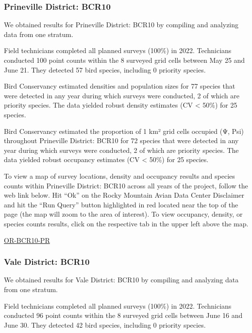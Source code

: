 \documentclass[
  letterpaper,
  DIV=11,
  numbers=noendperiod,
  oneside]{scrreprt}
\begin{document}
\hypertarget{prineville-district-bcr10}{%
\subsubsection{Prineville District:
BCR10}\label{prineville-district-bcr10}}

We obtained results for Prineville District: BCR10 by compiling and
analyzing data from one stratum.

Field technicians completed all planned surveys (100\%) in 2022.
Technicians conducted 100 point counts within the 8 surveyed grid cells
between May 25 and June 21. They detected 57 bird species, including 0
priority species.

Bird Conservancy estimated densities and population sizes for 77 species
that were detected in any year during which surveys were conducted, 2 of
which are priority species. The data yielded robust density estimates
(CV \textless{} 50\%) for 25 species.

Bird Conservancy estimated the proportion of 1 km² grid cells occupied
(Ψ, Psi) throughout Prineville District: BCR10 for 72 species that were
detected in any year during which surveys were conducted, 2 of which are
priority species. The data yielded robust occupancy estimates (CV
\textless{} 50\%) for 25 species.

To view a map of survey locations, density and occupancy results and
species counts within Prineville District: BCR10 across all years of the
project, follow the web link below. Hit ``Ok'' on the Rocky Mountain
Avian Data Center Disclaimer and hit the ``Run Query'' button
highlighted in red located near the top of the page (the map will zoom
to the area of interest). To view occupancy, density, or species counts
results, click on the respective tab in the upper left above the map.

\href{http://www.rmbo.org/new_site/adc/QueryWindow.aspx\#N4IgzgLgTghhCuBbEAuABCA8gJQLQCEBhbARgAZcAFbFfeKAUxnjQHsAzNAGRgDsATNAFk+MAOYNEDXhFxpKUAJa8GAN0UAbDQzQARRZCUBjCCAC+QA=}{OR-BCR10-PR}

\hypertarget{vale-district-bcr10}{%
\subsubsection{Vale District: BCR10}\label{vale-district-bcr10}}

We obtained results for Vale District: BCR10 by compiling and analyzing
data from one stratum.

Field technicians completed all planned surveys (100\%) in 2022.
Technicians conducted 96 point counts within the 8 surveyed grid cells
between June 16 and June 30. They detected 42 bird species, including 0
priority species.
\end{document}
